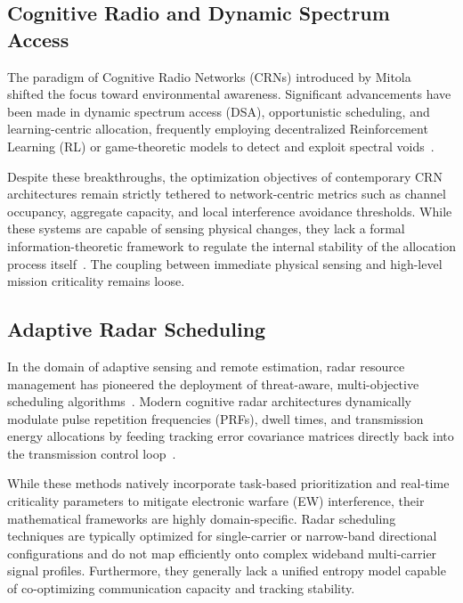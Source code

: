 \documentclass[journal,10pt,twocolumn,twoside]{IEEEtran}
\begin{document}
\subsection{Cognitive Radio and Dynamic Spectrum Access}

The paradigm of Cognitive Radio Networks (CRNs) introduced by Mitola~\cite{mitola1999cognitive} shifted the focus toward environmental awareness. Significant advancements have been made in dynamic spectrum access (DSA), opportunistic scheduling, and learning-centric allocation, frequently employing decentralized Reinforcement Learning (RL) or game-theoretic models to detect and exploit spectral voids~\cite{stamoulias2017adaptive, guvenc2011cognitive}.

Despite these breakthroughs, the optimization objectives of contemporary CRN architectures remain strictly tethered to network-centric metrics such as channel occupancy, aggregate capacity, and local interference avoidance thresholds. While these systems are capable of sensing physical changes, they lack a formal information-theoretic framework to regulate the internal stability of the allocation process itself~\cite{jang2019deep}. The coupling between immediate physical sensing and high-level mission criticality remains loose.

\subsection{Adaptive Radar Scheduling}

In the domain of adaptive sensing and remote estimation, radar resource management has pioneered the deployment of threat-aware, multi-objective scheduling algorithms~\cite{bell1997cognitive}. Modern cognitive radar architectures dynamically modulate pulse repetition frequencies (PRFs), dwell times, and transmission energy allocations by feeding tracking error covariance matrices directly back into the transmission control loop~\cite{havens2020cognitive, haykin2006cognitive}.

While these methods natively incorporate task-based prioritization and real-time criticality parameters to mitigate electronic warfare (EW) interference, their mathematical frameworks are highly domain-specific. Radar scheduling techniques are typically optimized for single-carrier or narrow-band directional configurations and do not map efficiently onto complex wideband multi-carrier signal profiles. Furthermore, they generally lack a unified entropy model capable of co-optimizing communication capacity and tracking stability.
\end{document}
